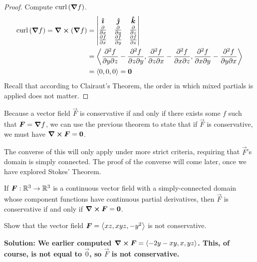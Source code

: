 \begin{proof}
Compute $\operatorname{curl}\,(\boldsymbol\nabla f)$.
    \begin{align*}
        \operatorname{curl}\,(\boldsymbol\nabla f) = \curl (\boldsymbol\nabla f) &=  \begin{vmatrix}
    \boldsymbol{\hat{\imath}} & \boldsymbol{\hat{\jmath}} & \boldsymbol{\hat{k}} \\
    \pdv{}{x} & \pdv{}{y} & \pdv{}{z} \\
    \pdv{f}{x} & \pdv{f}{y} & \pdv{f}{z}
\end{vmatrix}  \\
&= \left\langle \frac{\partial^2 f}{\partial y\partial z} - \frac{\partial^2 f}{\partial z\partial y}, \frac{\partial^2 f}{\partial z\partial x} - \frac{\partial^2 f}{\partial x \partial z}, \frac{\partial^2 f}{\partial x\partial y} - \frac{\partial^2 f}{\partial y\partial x} \right\rangle \\&= \left\langle0, 0, 0\right\rangle = \boldsymbol{0}
    \end{align*}
    Recall that according to Clairaut's Theorem, the order in which mixed partials is applied does not matter.
\end{proof}
Because a vector field $\vec F$ is conservative if and only if there exists some $f$ such that $\boldsymbol{F} = \boldsymbol\nabla f$, we can use the previous theorem to state that if $\vec F$ is conservative, we must have $\curl \boldsymbol{F} = \boldsymbol{0}$.\par
The converse of this will only apply under more strict criteria, requiring that $\vec F$'s domain is simply connected. The proof of the converse will come later, once we have explored Stokes' Theorem.
\begin{theorem} \label{curlfzero}
    If $\boldsymbol{F}: \mathbb{R}^3\to\mathbb{R}^3$ is a continuous vector field with a simply-connected domain whose component functions have continuous partial derivatives, then $\vec F$ is conservative if and only if $\curl \boldsymbol{F} = \boldsymbol{0}$. 
\end{theorem}
\begin{example}
    Show that the vector field $\boldsymbol{F} = \left\langle xz, xyz, -y^2\right\rangle$ is not conservative.\par
    \bf{Solution:} We earlier computed $\curl \boldsymbol{F} = \left\langle-2y-xy, x, yz\right\rangle$. This, of course, is not equal to $\vec 0$, so $\vec F$ is not conservative.
\end{example}
